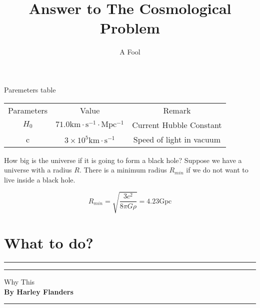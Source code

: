 \documentclass[12pt,a4paper]{article}
\begin{document}
\title{Answer to The Cosmological Problem}
\author{A Fool}
\maketitle

\newcommand{\dd}{\mathrm d}
\newcommand{\HH}{\mathcal H}
\newcommand{\CN}{{\it Cosmologia Notebook}}
\newenvironment{eqnset}
{\begin{equation}\left \bracevert \begin{array}{l}}
{\end{array} \right. \end{equation}}

\newenvironment{eqn}
{\begin{equation}\left \bracevert \begin{array}{l}}
{\end{array} \right. \end{equation}}




Paremeters table

\begin{tabular}{ccc}
	Parameters & Value & Remark\\
	$H_0$ & $71.0 \mathrm{km\cdot s^{-1}\cdot Mpc^{-1}}$ & Current Hubble Constant \\
	c & $3\times 10^5\mathrm {km\cdot s^{-1}}$ & Speed of light in vacuum\\
\end{tabular}


How big is the universe if it is going to form a black hole? Suppose we have a universe with a radius $R$. There is a minimum radius $R_{min}$ if we do not want to live inside a black hole. 

\begin{equation}
R_{min}=\sqrt{\frac{3c^2}{8\pi G \rho}}=4.23 \mathrm{Gpc}
\end{equation}

\section{What to do?}






\hrule
\hrule
\vspace{1ex}
\begin{center}
{\Large Why This  \\ \vspace{1ex}
{\bf By Harley Flanders}}
\end{center}
\vspace{1ex}
\hrule
\vspace{5ex}
\end{document}
